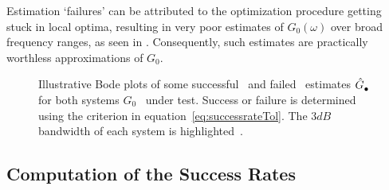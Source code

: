  Estimation `failures' can be attributed to the optimization procedure getting stuck in local optima, resulting in very poor estimates of $G_0(\omega)$ over broad frequency ranges, as seen in . 
 Consequently, such estimates are practically worthless approximations of $G_0$.


\begin{figure}
  \centering
  \setlength{\figurewidth}{0.8\onecolumnwidth}
  \setlength{\figureheight}{0.6\figurewidth}
  
 \caption[Bodeplot of successful ad failed estimates.]{Illustrative Bode plots of some successful~ and failed~ estimates $\hat{G}_{\mathrm{\bullet}}^{\mathrm{}}$ for both systems $G_0$~ under test.
 Success or failure is determined using the criterion in equation~\eqref{eq:successrateTol}. The $3\unit{dB}$ bandwidth of each system is highlighted~.}
\label{fig:exampleFRF}
\end{figure}

\subsection{Computation of  the Success Rates}\label{se:CompuSR}

